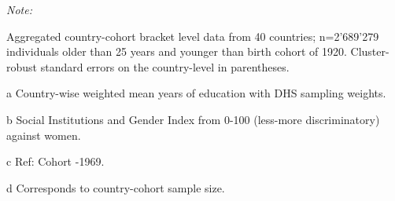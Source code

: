 \begin{table}
\begin{threeparttable}
\begin{tablenotes}
\item \textit{Note: } 
\item Aggregated country-cohort bracket level data from 40 countries;
  n=2'689'279 individuals older than 25 years and younger than birth cohort of 1920. 
           Cluster-robust standard errors on the country-level in parentheses.
\item[a] Country-wise weighted mean years of education with DHS sampling weights.
\item[b] Social Institutions and Gender Index from 0-100 (less-more discriminatory) against women.
\item[c] Ref: Cohort -1969.
\item[d] Corresponds to country-cohort sample size.
\end{tablenotes}
\end{threeparttable}
\end{table}

